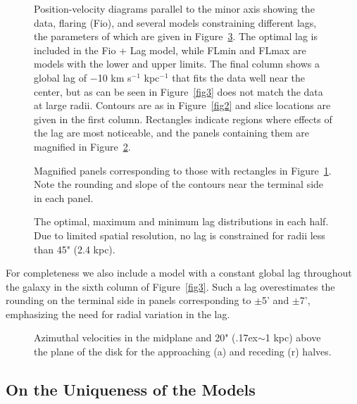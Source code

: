 \documentclass{emulateapj}
\begin{document}
\begin{figure}
\caption{Position-velocity diagrams parallel to the minor axis showing the data, flaring (Fio), and several models constraining different lags, the parameters of which are given in Figure~\ref{fig13}.  The optimal lag is included in the Fio + Lag model, while FLmin and FLmax are models with the lower and upper limits.  The final column shows a global lag of $-$10 km s$^{-1}$ kpc$^{-1}$ that fits the data well near the center, but as can be seen in Figure~\ref{fig3} does not match the data at large radii. Contours are as in Figure~\ref{fig2} and slice locations are given in the first column.  Rectangles indicate regions where effects of the lag are most noticeable, and the panels containing them are magnified in Figure~\ref{fig12b}. \label{fig12a}}
\end{figure}

\begin{figure}
\caption{Magnified panels corresponding to those with rectangles in Figure~\ref{fig12a}.  Note the rounding and slope of the contours near the terminal side in each panel.\label{fig12b}}
\end{figure}

\begin{figure}
\caption{The optimal, maximum and minimum lag distributions in each half.  Due to limited spatial resolution, no lag is constrained for radii less than 45" (2.4 kpc).\label{fig13}}
\end{figure}


\par
     For completeness we also include a model with a constant global lag throughout the galaxy in the sixth column of Figure~\ref{fig3}.  Such a lag overestimates the rounding on the terminal side in panels corresponding to $\pm$5' and $\pm$7', emphasizing the need for radial variation in the lag.

\begin{figure}
\caption{Azimuthal velocities in the midplane and 20" ({\raise.17ex\hbox{$\scriptstyle\sim$}}1 kpc) above the plane of the disk for the approaching (a) and receding (r) halves.\label{fig14}}
\end{figure}

\subsection{On the Uniqueness of the Models} \label{Section4.2}
\end{document}
